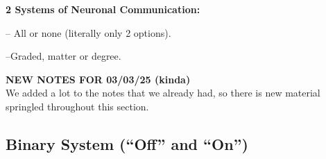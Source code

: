 \begin{coloredlist}
    \item \textbf{2 Systems of Neuronal Communication:}
    \begin{coloredlist}
        \item {} -- All or none (literally only 2 options).
        \item {} --Graded, matter or degree.
    \end{coloredlist}
\end{coloredlist}

\begin{center}
    \textbf{NEW NOTES FOR 03/03/25 (kinda)} \\
    We added a lot to the notes that we already had, so there is new material springled throughout this section. \\
    \hrulefill
\end{center}

\subsection{Binary System (``Off'' and ``On'')}

